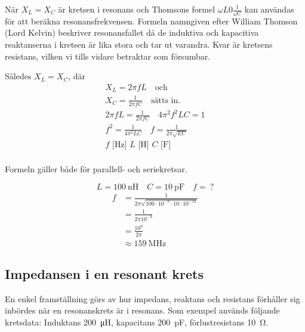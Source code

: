 När \(X_L = X_C\) är kretsen i resonans och Thomsons formel
\(\omega L 0 \frac{1}{\omega C}\) kan användas för att beräkna
resonansfrekvensen.
Formeln namngiven efter William Thomson (Lord Kelvin) beskriver resonansfallet
då de induktiva och kapacitiva reaktanserna i kretsen är lika stora och tar ut
varandra.
Kvar är kretsens resistans, vilken vi tills vidare betraktar som försumbar.

Således \(X_L = X_C\), där
%
\begin{gather*}
  X_L = 2\pi fL \quad \text{och} \\
  X_C = \frac{1}{2\pi fC} \quad \text{sätts in.} \\
  2\pi fL = \frac{1}{2\pi fC} \quad 4\pi ^2f^2LC = 1 \\
  f^2 = \frac{1}{4\pi ^2LC} \quad f = \frac{1}{2\pi \sqrt{LC}} \\
  f\text{ [Hz] }L\text{ [H] }C\text{ [F] } \\
\end{gather*}

Formeln gäller både för parallell- och seriekretsar.

\vspace*{1ex}
\begin{exempelbox}
\noindent
\[L = \qty{100}{\nano\henry} \quad C = \qty{10}{\pico\farad} \quad f =\ ?\]
\tcblower
\begin{align*}
  f &= \frac{1}{2\pi \sqrt{100 \cdot 10^{-9} \cdot 10 \cdot 10^{-12}}} \\
  &= \frac{1}{2\pi 10^{-9}} \\
  &= \frac{10^9}{2\pi } \\
  &\approx \qty{159}{\mega\hertz}
\end{align*}
\end{exempelbox}

\subsection{Impedansen i en resonant krets}
\label{impedans_resonant_krets}


En enkel framställning görs av hur impedans, reaktans och resistans förhåller
sig inbördes när en resonanskrets är i resonans.
Som exempel används följande kretsdata: Induktans \qty{200}{\micro\henry},
kapacitans \qty{200}{\pico\farad}, förlustresistans \qty{10}{\ohm}.

